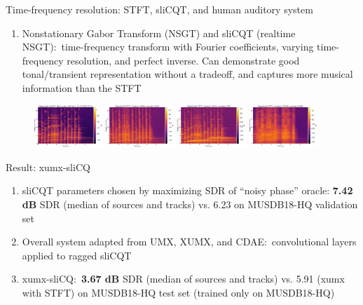 \documentclass[final]{beamer}
\begin{document}
\begin{frame}{}
\begin{block}{Time-frequency resolution: STFT, sliCQT, and human auditory system}
\begin{enumerate}
		  \item
			  Nonstationary Gabor Transform (NSGT) and sliCQT (realtime NSGT):\footnotemark\ time-frequency transform with Fourier coefficients, varying time-frequency resolution, and perfect inverse. Can demonstrate good tonal/transient representation without a tradeoff, and captures more musical information than the STFT
	  \end{enumerate}
    \end{block}
	\begin{figure}
		  \centering
		  \includegraphics[width=0.23\textwidth]{./images-poster/slicq.png}
		  \includegraphics[width=0.23\textwidth]{./images-poster/stft.png}
		  \includegraphics[width=0.23\textwidth]{./images-poster/stft_small.png}
		  \includegraphics[width=0.23\textwidth]{./images-poster/stft_big.png}
	  \end{figure}
	\begin{block}{Result: xumx-sliCQ}
	  \begin{enumerate}
		  \item
			  sliCQT parameters chosen by maximizing SDR of ``noisy phase'' oracle: \textbf{7.42 dB} SDR (median of sources and tracks) vs. 6.23 on MUSDB18-HQ validation set
		  \item
			  Overall system adapted from UMX, XUMX, and CDAE:\footnotemark\ convolutional layers applied to ragged sliCQT\footnotemark
		  \item
			  xumx-sliCQ:\footnotemark\ \textbf{3.67 dB} SDR (median of sources and tracks) vs. 5.91 (xumx with STFT) on MUSDB18-HQ test set (trained only on MUSDB18-HQ)

\end{enumerate}
\end{block}
\end{frame}
\end{document}
